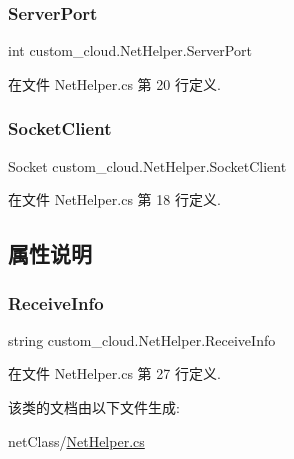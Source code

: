 \subsubsection{\texorpdfstring{Server\+Port}{ServerPort}}
{\footnotesize\ttfamily int custom\+\_\+cloud.\+Net\+Helper.\+Server\+Port}



在文件 Net\+Helper.\+cs 第 20 行定义.

\mbox{\label{classcustom__cloud_1_1_net_helper_a3a3ac000b75ac4a7a1a280cffe454bf3}} 
\subsubsection{\texorpdfstring{Socket\+Client}{SocketClient}}
{\footnotesize\ttfamily Socket custom\+\_\+cloud.\+Net\+Helper.\+Socket\+Client}



在文件 Net\+Helper.\+cs 第 18 行定义.



\subsection{属性说明}
\mbox{\label{classcustom__cloud_1_1_net_helper_af8ff618b2e04688c47e2a706bab175e8}} 
\subsubsection{\texorpdfstring{Receive\+Info}{ReceiveInfo}}
{\footnotesize\ttfamily string custom\+\_\+cloud.\+Net\+Helper.\+Receive\+Info\hspace{0.3cm}{\ttfamily [get]}}



在文件 Net\+Helper.\+cs 第 27 行定义.



该类的文档由以下文件生成\+:\begin{DoxyCompactItemize}
\item 
net\+Class/\hyperlink{_net_helper_8cs}{Net\+Helper.\+cs}\end{DoxyCompactItemize}
